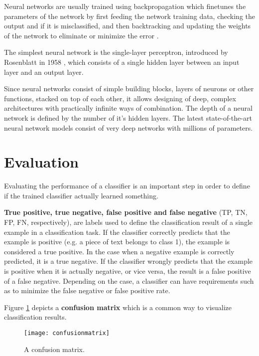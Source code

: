 Neural networks are usually trained using backpropagation which finetunes the parameters of the network by first feeding the network training data, checking the output and if it is misclassified, and then backtracking and updating the weights of the network to eliminate or minimize the error \cite{sebastiani2002}.

The simplest neural network is the single-layer perceptron, introduced by Rosenblatt in 1958 \cite{rosenblatt1958}, which consists of a single hidden layer between an input layer and an output layer.

Since neural networks consist of simple building blocks, layers of neurons or other functions, stacked on top of each other, it allows designing of deep, complex architectures with practically infinite ways of combination.
The depth of a neural network is defined by the number of it's hidden layers.
The latest state-of-the-art neural network models consist of very deep networks with millions of parameters.

\section{Evaluation} \label{Evaluation}
Evaluating the performance of a classifier is an important step in order to define if the trained classifier actually learned something.

\textbf{True positive, true negative, false positive and false negative} (TP, TN, FP, FN, respectively), are labels used to define the classification result of a single example in a classification task.
If the classifier correctly predicts that the example is positive (e.g. a piece of text belongs to class 1), the example is considered a true positive.
In the case when a negative example is correctly predicted, it is a true negative.
If the classifier wrongly predicts that the example is positive when it is actually negative, or vice versa, the result is a false positive of a false negative.
Depending on the case, a classifier can have requirements such as to minimize the false negative or false positive rate.

Figure \ref{fig:confusionmatrix} depicts a \textbf{confusion matrix} which is a common way to visualize classification results.

\begin{figure}[t]
\texttt{[image: confusionmatrix]}
\centering
\caption{A confusion matrix.}
\label{fig:confusionmatrix}
\end{figure}

